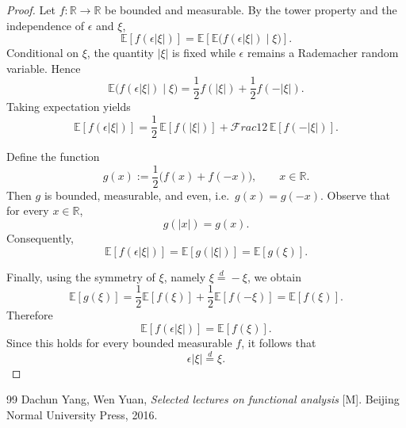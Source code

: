 \documentclass[12pt]{article}
\renewcommand{\(}{\left(}%
\renewcommand{\)}{\right)}%
\renewcommand{\[}{\left[}%
\renewcommand{\]}{\right]}%
\newcommand{\f}{\mathscr{F}}
\newtheorem{proof}{Proof.}}
\begin{document}
\begin{proof}
Let $f:\mathbb R\to\mathbb R$ be bounded and measurable. By the tower property
and the independence of $\epsilon$ and $\xi$,
\begin{equation*}
\mathbb E[f(\epsilon|\xi|)]
=
\mathbb E\!\left[\mathbb E\big(f(\epsilon|\xi|)\mid \xi\big)\right].
\end{equation*}
Conditional on $\xi$, the quantity $|\xi|$ is fixed while $\epsilon$
remains a Rademacher random variable. Hence
\begin{equation*}
\mathbb E\big(f(\epsilon|\xi|)\mid \xi\big)
=
\frac12 f(|\xi|)+\frac12 f(-|\xi|).
\end{equation*}
Taking expectation yields
\begin{equation*}
\mathbb E[f(\epsilon|\xi|)]
=
\frac12\,\mathbb E[f(|\xi|)]
+
\f rac12\,\mathbb E[f(-|\xi|)].
\end{equation*}

Define the function
\begin{equation*}
g(x):=\frac12\big(f(x)+f(-x)\big), \qquad x\in\mathbb R.
\end{equation*}
Then $g$ is bounded, measurable, and even, i.e.\ $g(x)=g(-x)$.
Observe that for every $x\in\mathbb R$,
\begin{equation*}
g(|x|)=g(x).
\end{equation*}
Consequently,
\begin{equation*}
\mathbb E[f(\epsilon|\xi|)]
=
\mathbb E[g(|\xi|)]
=
\mathbb E[g(\xi)].
\end{equation*}

Finally, using the symmetry of $\xi$, namely $\xi\overset d=-\xi$, we obtain
\begin{equation*}
\mathbb E[g(\xi)]
=
\frac12\mathbb E[f(\xi)]
+
\frac12\mathbb E[f(-\xi)]
=
\mathbb E[f(\xi)].
\end{equation*}
Therefore
\begin{equation*}
\mathbb E[f(\epsilon|\xi|)]=\mathbb E[f(\xi)].
\end{equation*}
Since this holds for every bounded measurable $f$, it follows that
\begin{equation*}
\epsilon|\xi|\overset{d}{=}\xi .
\end{equation*}
\end{proof}

  \begin{thebibliography}{99}
    Dachun Yang, Wen Yuan, {\itshape Selected lectures on functional analysis} [M]. Beijing Normal University Press, 2016.
  \end{thebibliography}
\end{document}
